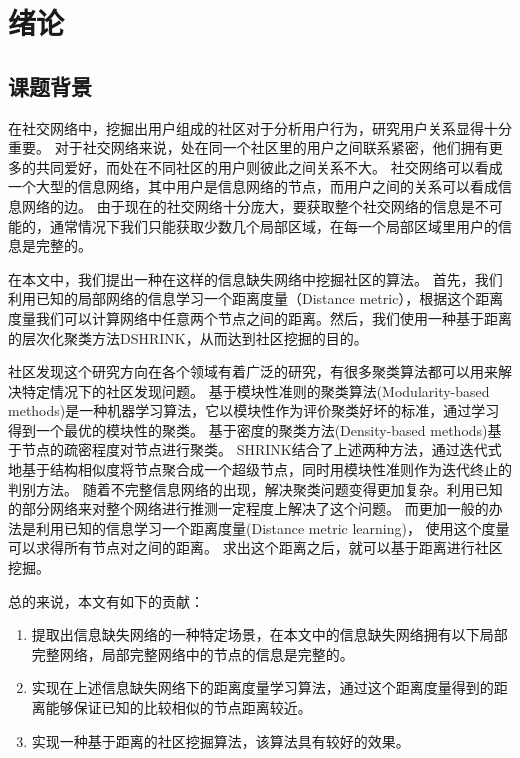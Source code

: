\chapter{绪论}
\label{chap:intro}

\section{课题背景}

在社交网络中，挖掘出用户组成的社区对于分析用户行为，研究用户关系显得十分重要。
对于社交网络来说，处在同一个社区里的用户之间联系紧密，他们拥有更多的共同爱好，而处在不同社区的用户则彼此之间关系不大。
社交网络可以看成一个大型的信息网络，其中用户是信息网络的节点，而用户之间的关系可以看成信息网络的边。
由于现在的社交网络十分庞大，要获取整个社交网络的信息是不可能的，通常情况下我们只能获取少数几个局部区域，在每一个局部区域里用户的信息是完整的。

在本文中，我们提出一种在这样的信息缺失网络中挖掘社区的算法。
首先，我们利用已知的局部网络的信息学习一个距离度量（Distance metric），根据这个距离度量我们可以计算网络中任意两个节点之间的距离。然后，我们使用一种基于距离的层次化聚类方法DSHRINK，从而达到社区挖掘的目的。

社区发现这个研究方向在各个领域有着广泛的研究，有很多聚类算法都可以用来解决特定情况下的社区发现问题。
基于模块性准则的聚类算法(Modularity-based methods)是一种机器学习算法，它以模块性作为评价聚类好坏的标准，通过学习得到一个最优的模块性的聚类。
基于密度的聚类方法(Density-based methods)基于节点的疏密程度对节点进行聚类。
SHRINK结合了上述两种方法，通过迭代式地基于结构相似度将节点聚合成一个超级节点，同时用模块性准则作为迭代终止的判别方法。
随着不完整信息网络的出现，解决聚类问题变得更加复杂。利用已知的部分网络来对整个网络进行推测一定程度上解决了这个问题。
而更加一般的办法是利用已知的信息学习一个距离度量(Distance metric learning)，
使用这个度量可以求得所有节点对之间的距离。
求出这个距离之后，就可以基于距离进行社区挖掘。

总的来说，本文有如下的贡献：

\begin{enumerate}
\item 提取出信息缺失网络的一种特定场景，在本文中的信息缺失网络拥有以下局部完整网络，局部完整网络中的节点的信息是完整的。
\item 实现在上述信息缺失网络下的距离度量学习算法，通过这个距离度量得到的距离能够保证已知的比较相似的节点距离较近。
\item 实现一种基于距离的社区挖掘算法，该算法具有较好的效果。
\end{enumerate}

